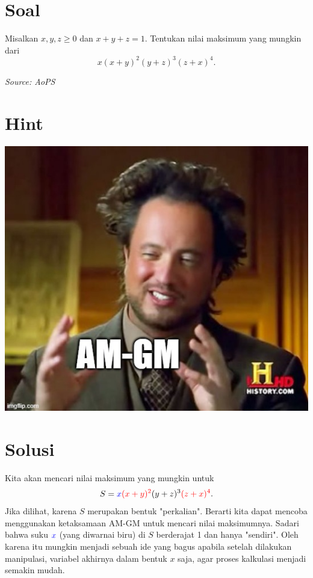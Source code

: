 \documentclass[12pt]{scrartcl}
\title{}
\author{Ineq 1, 2, 3, 4}
\date{}
\begin{document}
\maketitle
\pagestyle{plain}

\section{Soal}
Misalkan $x,y,z \ge 0$ dan $x+y+z=1$. Tentukan nilai maksimum yang mungkin dari 
$$x(x+y)^2(y+z)^3(z+x)^4.$$

\textit{Source: AoPS}

\newpage
\section{Hint}
\includegraphics[width=\linewidth]{am gm meme.jpg}
\newpage
\section{Solusi}
Kita akan mencari nilai maksimum yang mungkin untuk $$S={\color{blue}x}{\color{red}(x+y)^2}(y+z)^3{\color{red}(z+x)^4}.$$
Jika dilihat, karena $S$ merupakan bentuk "perkalian". Berarti kita dapat mencoba menggunakan ketaksamaan AM-GM untuk mencari nilai maksimumnya. Sadari bahwa suku ${\color{blue}x}$ (yang diwarnai biru) di $S$ berderajat 1 dan hanya "sendiri". Oleh karena itu mungkin menjadi sebuah ide yang bagus apabila setelah dilakukan manipulasi, variabel akhirnya dalam bentuk $x$ saja, agar proses kalkulasi menjadi semakin mudah. 
\end{document}
